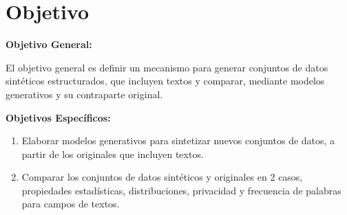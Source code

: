 \section{Objetivo}
\textbf{Objetivo General:}

El objetivo general es definir un mecanismo para generar conjuntos de datos sintéticos estructurados, que incluyen textos y comparar, mediante modelos generativos y su contraparte original.

\textbf{Objetivos Específicos:} 
\begin{enumerate}
    \item Elaborar modelos generativos para sintetizar nuevos conjuntos de datos, a partir de los originales que incluyen textos.
    \item Comparar los conjuntos de datos sintéticos y originales en 2 casos, propiedades estadísticas, distribuciones, privacidad y frecuencia de palabras para campos de textos.
\end{enumerate}

